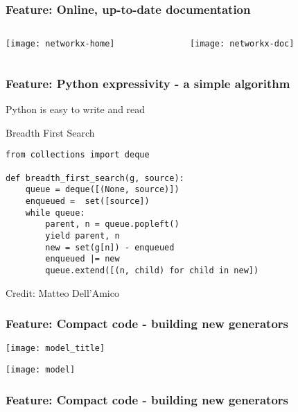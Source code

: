 \begin{frame}
\frametitle{Feature: Online, up-to-date documentation}
\begin{columns}[T]
\begin{column}{0.5\textwidth}
\centerline{\texttt{[image: networkx-home]}}
\end{column}
\begin{column}{0.5\textwidth}
\centerline{\texttt{[image: networkx-doc]}}
\end{column}
\end{columns}
\end{frame}


\begin{frame}[fragile]
\frametitle{Feature: Python expressivity - a simple algorithm}
Python is easy to write and read
\begin{block}{Breadth First Search}
\begin{verbatim}
from collections import deque

def breadth_first_search(g, source):
    queue = deque([(None, source)])
    enqueued =  set([source])
    while queue:
        parent, n = queue.popleft()
        yield parent, n
        new = set(g[n]) - enqueued
        enqueued |= new
        queue.extend([(n, child) for child in new])
\end{verbatim}
\end{block}
Credit: Matteo Dell'Amico
\end{frame}




\begin{frame}[fragile]
\frametitle{Feature: Compact code - building new generators}
\centerline{\texttt{[image: model\_title]}}
\centerline{\texttt{[image: model]}}
\end{frame}


\begin{frame}[fragile]
\frametitle{Feature: Compact code - building new generators}
\begin{block}{}
\tiny

\end{block}
\end{frame}

